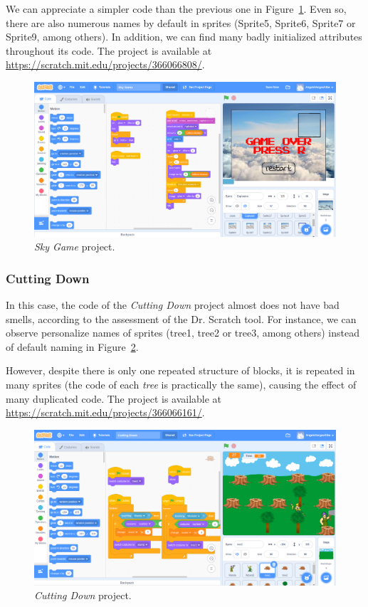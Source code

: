 We can appreciate a simpler code than the previous one in Figure~\ref{fig:sky_game}. Even so, there are also numerous names by default in sprites (Sprite5, Sprite6, Sprite7 or Sprite9, among others). In addition, we can find many badly initialized attributes throughout its code. The project is available at \url{https://scratch.mit.edu/projects/366066808/}.

 \begin{figure}
    \centering
    \includegraphics[width=13cm,                         keepaspectratio]{img/sky_game.png}
    \caption{\textit{Sky Game} project.}
    \label{fig:sky_game}
\end{figure}

\subsubsection{Cutting Down}
\label{subsubsec:cutting_down}

In this case, the code of the \textit{Cutting Down} project almost does not have bad smells, according to the assessment of the Dr. Scratch tool. For instance, we can observe personalize names of sprites (tree1, tree2 or tree3, among others) instead of default naming in Figure~\ref{fig:cutting_down}.

However, despite there is only one repeated structure of blocks, it is repeated in many sprites (the code of each \textit{tree} is practically the same), causing the effect of many duplicated code. The project is available at \url{https://scratch.mit.edu/projects/366066161/}.

 \begin{figure}
    \centering
    \includegraphics[width=13cm,                         keepaspectratio]{img/cutting_down.png}
    \caption{\textit{Cutting Down} project.}
    \label{fig:cutting_down}
\end{figure}

